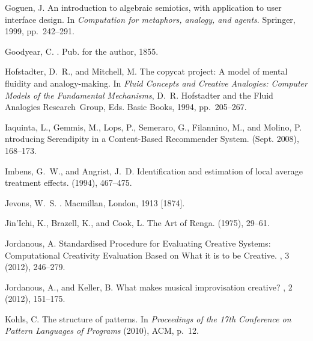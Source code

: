 \documentclass{llncs}
\begin{document}
\begin{thebibliography}{10}
{\sc Goguen, J.}
\newblock An introduction to algebraic semiotics, with application to user
  interface design.
\newblock In {\em Computation for metaphors, analogy, and agents}. Springer,
  1999, pp.~242--291.

{\sc Goodyear, C.}
.
\newblock Pub. for the author, 1855.

{\sc Hofstadter, D.~R., and Mitchell, M.}
\newblock The copycat project: {A} model of mental fluidity and analogy-making.
\newblock In {\em {F}luid {C}oncepts and {C}reative {A}nalogies: {C}omputer
  {M}odels of the {F}undamental {M}echanisms}, D.~R. Hofstadter and the Fluid
  Analogies Research~Group, Eds. Basic Books, 1994, pp.~205--267.

{\sc Iaquinta, L., Gemmis, M., Lops, P., Semeraro, G., Filannino, M., and
  Molino, P.}
ntroducing {S}erendipity in a {C}ontent-{B}ased {R}ecommender
  {S}ystem.
 (Sept. 2008),
  168--173.

{\sc Imbens, G.~W., and Angrist, J.~D.}
\newblock Identification and estimation of local average treatment effects.
 (1994),
  467--475.

{\sc Jevons, W.~S.}
.
\newblock Macmillan, London, {1913 [1874]}.

{\sc Jin'Ichi, K., Brazell, K., and Cook, L.}
\newblock The {A}rt of {R}enga.
 (1975), 29--61.

{\sc Jordanous, A.}
 {S}tandardised {P}rocedure for {E}valuating {C}reative {S}ystems:
  {C}omputational {C}reativity {E}valuation {B}ased on {W}hat it is to be
  {C}reative.
, 3 (2012), 246--279.

{\sc Jordanous, A., and Keller, B.}
\newblock What makes musical improvisation creative?
, 2 (2012),
  151--175.

{\sc Kohls, C.}
\newblock The structure of patterns.
\newblock In {\em {P}roceedings of the 17th {C}onference on {P}attern
  {L}anguages of {P}rograms\/} (2010), ACM, p.~12.


\end{thebibliography}
\end{document}
